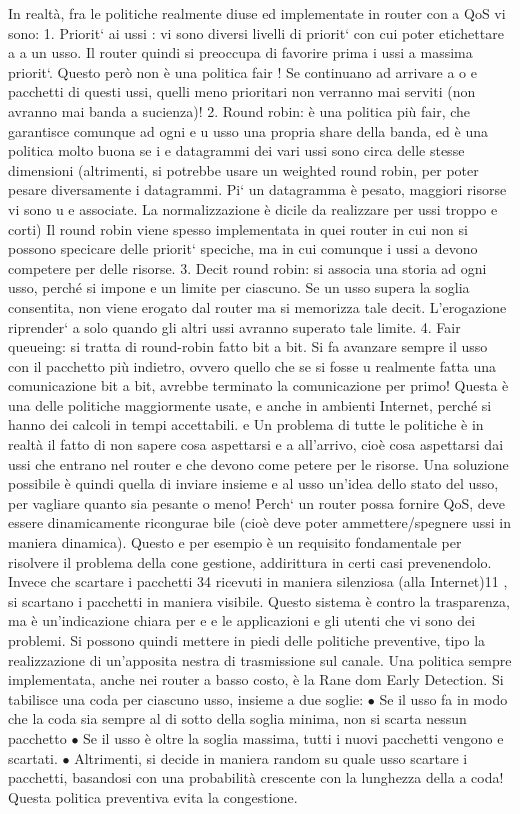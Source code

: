 In realtà, fra le politiche realmente diuse ed implementate in router con
a
QoS vi sono:
1. Priorit` ai ussi : vi sono diversi livelli di priorit` con cui poter etichettare
a
a
un usso. Il router quindi si preoccupa di favorire prima i ussi a massima
priorit`. Questo però non è una politica fair ! Se continuano ad arrivare
a
o
e
pacchetti di questi ussi, quelli meno prioritari non verranno mai serviti
(non avranno mai banda a sucienza)!
2. Round robin: è una politica più fair, che garantisce comunque ad ogni
e
u
usso una propria share della banda, ed è una politica molto buona se i
e
datagrammi dei vari ussi sono circa delle stesse dimensioni (altrimenti,
si potrebbe usare un weighted round robin, per poter pesare diversamente
i datagrammi. Pi` un datagramma è pesato, maggiori risorse vi sono
u
e
associate. La normalizzazione è dicile da realizzare per ussi troppo
e
corti) Il round robin viene spesso implementata in quei router in cui non
si possono specicare delle priorit` speciche, ma in cui comunque i ussi
a
devono competere per delle risorse.
3. Decit round robin: si associa una storia ad ogni usso, perché si impone
e
un limite per ciascuno. Se un usso supera la soglia consentita, non viene
erogato dal router ma si memorizza tale decit. L'erogazione riprender`
a
solo quando gli altri ussi avranno superato tale limite.
4. Fair queueing: si tratta di round-robin fatto bit a bit. Si fa avanzare
sempre il usso con il pacchetto più indietro, ovvero quello che se si fosse
u
realmente fatta una comunicazione bit a bit, avrebbe terminato la comunicazione per primo! Questa è una delle politiche
maggiormente usate,
e
anche in ambienti Internet, perché si hanno dei calcoli in tempi accettabili.
e
Un problema di tutte le politiche è in realtà il fatto di non sapere cosa aspettarsi
e
a
all'arrivo, cioè cosa aspettarsi dai ussi che entrano nel router e che devono come
petere per le risorse. Una soluzione possibile è quindi quella di inviare insieme
e
al usso un'idea dello stato del usso, per vagliare quanto sia pesante o meno!
Perch` un router possa fornire QoS, deve essere dinamicamente ricongurae
bile (cioè deve poter ammettere/spegnere ussi in maniera dinamica). Questo
e
per esempio è un requisito fondamentale per risolvere il problema della cone
gestione, addirittura in certi casi prevenendolo. Invece che scartare i pacchetti
34
ricevuti in maniera silenziosa (alla Internet)11 , si scartano i pacchetti in maniera
visibile. Questo sistema è contro la trasparenza, ma è un'indicazione chiara per
e
e
le applicazioni e gli utenti che vi sono dei problemi. Si possono quindi mettere
in piedi delle politiche preventive, tipo la realizzazione di un'apposita nestra di
trasmissione sul canale.
Una politica sempre implementata, anche nei router a basso costo, è la Rane
dom Early Detection. Si tabilisce una coda per ciascuno usso, insieme a due
soglie:
$\bullet$ Se il usso fa in modo che la coda sia sempre al di sotto della soglia
minima, non si scarta nessun pacchetto
$\bullet$ Se il usso è oltre la soglia massima, tutti i nuovi pacchetti vengono
e
scartati.
$\bullet$ Altrimenti, si decide in maniera random su quale usso scartare i pacchetti, basandosi con una probabilità
crescente con la lunghezza della
a
coda!
Questa politica preventiva evita la congestione.
